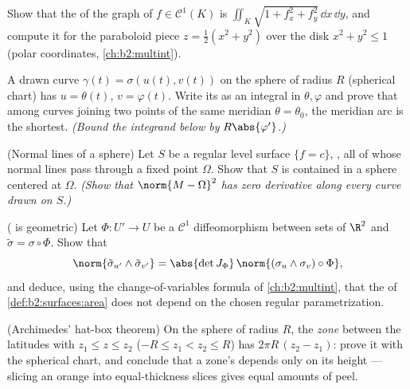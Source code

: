 \begin{exercise}[$\star\star$]\label{exo:b2:surfaces:5}
Show that the  of the graph of $f \in \mathcal{C}^1(K)$ is
$\iint_K \sqrt{1 + f_x^2 + f_y^2}\,\dd x\,\dd y$, and compute it
for the paraboloid piece $z = \frac12(x^2 + y^2)$ over the disk
$x^2 + y^2 \leq 1$ (polar coordinates,
\cref{ch:b2:multint}).
\end{exercise}

\begin{exercise}[$\star\star$]\label{exo:b2:surfaces:6}
A drawn curve $\gamma(t) = \sigma(u(t), v(t))$ on the sphere of
radius $R$ (spherical chart) has $u = \theta(t)$, $v =
\varphi(t)$. Write its  as an integral in $\theta, \varphi$
and prove that among curves joining two points of the same
meridian $\theta = \theta_0$, the meridian arc is the shortest.
\emph{(Bound the integrand below by $R\abs{\varphi'}$.)}
\end{exercise}

\begin{exercise}[$\star\star\star$]\label{exo:b2:surfaces:7}
(Normal lines of a sphere) Let $S$ be a regular level surface
$\{f = c\}$, , all of whose normal lines pass through a
fixed point $\Omega$. Show that $S$ is contained in a sphere
centered at $\Omega$. \emph{(Show that $\norm{M - \Omega}^2$ has
zero derivative along every curve drawn on $S$.)}
\end{exercise}

\begin{exercise}[$\star\star\star$]\label{exo:b2:surfaces:8}
( is geometric) Let $\Phi \colon U' \to U$ be a $\mathcal{C}^1$
diffeomorphism between  sets of $\R^2$ and $\tilde\sigma =
\sigma \circ \Phi$. Show that
\[
\norm{\tilde\sigma_{u'} \wedge \tilde\sigma_{v'}}
= \abs{\det J_\Phi}\,
\norm{(\sigma_u \wedge \sigma_v)\circ\Phi} ,
\]
and deduce, using the change-of-variables formula of
\cref{ch:b2:multint}, that the  of
\cref{def:b2:surfaces:area} does not depend on the chosen regular
parametrization.
\end{exercise}

\begin{exercise}[$\star$]\label{exo:b2:surfaces:9}
(Archimedes' hat-box theorem) On the sphere of radius $R$, the
\emph{zone} between the latitudes with $z_1 \leq z \leq z_2$
($-R \leq z_1 < z_2 \leq R$) has  $2\pi R\,(z_2 - z_1)$:
prove it with the spherical chart, and conclude that a zone's
 depends only on its height --- slicing an orange into
equal-thickness slices gives equal amounts of peel.
\end{exercise}

